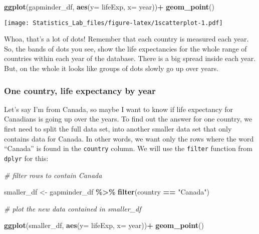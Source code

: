 \documentclass[
]{book}
\newenvironment{Shaded}{\begin{snugshade}}{\end{snugshade}}
\newcommand{\AttributeTok}[1]{\textcolor[rgb]{0.13,0.29,0.53}{#1}}
\newcommand{\CommentTok}[1]{\textcolor[rgb]{0.56,0.35,0.01}{\textit{#1}}}
\newcommand{\FunctionTok}[1]{\textcolor[rgb]{0.13,0.29,0.53}{\textbf{#1}}}
\newcommand{\NormalTok}[1]{#1}
\newcommand{\OtherTok}[1]{\textcolor[rgb]{0.56,0.35,0.01}{#1}}
\newcommand{\SpecialCharTok}[1]{\textcolor[rgb]{0.81,0.36,0.00}{\textbf{#1}}}
\newcommand{\StringTok}[1]{\textcolor[rgb]{0.31,0.60,0.02}{#1}}
\begin{document}
\begin{Shaded}
\begin{Highlighting}[]
\FunctionTok{ggplot}\NormalTok{(gapminder\_df, }\FunctionTok{aes}\NormalTok{(}\AttributeTok{y=}\NormalTok{ lifeExp, }\AttributeTok{x=}\NormalTok{ year))}\SpecialCharTok{+}
  \FunctionTok{geom\_point}\NormalTok{()}
\end{Highlighting}
\end{Shaded}

\texttt{[image: Statistics\_Lab\_files/figure-latex/1scatterplot-1.pdf]}

Whoa, that's a lot of dots! Remember that each country is measured each year. So, the bands of dots you see, show the life expectancies for the whole range of countries within each year of the database. There is a big spread inside each year. But, on the whole it looks like groups of dots slowly go up over years.

\hypertarget{one-country-life-expectancy-by-year}{%
\subsubsection{One country, life expectancy by year}\label{one-country-life-expectancy-by-year}}

Let's say I'm from Canada, so maybe I want to know if life expectancy for Canadians is going up over the years. To find out the answer for one country, we first need to split the full data set, into another smaller data set that only contains data for Canada. In other words, we want only the rows where the word ``Canada'' is found in the \texttt{country} column. We will use the \texttt{filter} function from \texttt{dplyr} for this:

\begin{Shaded}
\begin{Highlighting}[]
\CommentTok{\# filter rows to contain Canada}

\NormalTok{smaller\_df }\OtherTok{\textless{}{-}}\NormalTok{ gapminder\_df }\SpecialCharTok{\%\textgreater{}\%} 
                 \FunctionTok{filter}\NormalTok{(country }\SpecialCharTok{==} \StringTok{"Canada"}\NormalTok{)}

\CommentTok{\# plot the new data contained in smaller\_df}

\FunctionTok{ggplot}\NormalTok{(smaller\_df, }\FunctionTok{aes}\NormalTok{(}\AttributeTok{y=}\NormalTok{ lifeExp, }\AttributeTok{x=}\NormalTok{ year))}\SpecialCharTok{+}
  \FunctionTok{geom\_point}\NormalTok{()}
\end{Highlighting}
\end{Shaded}
\end{document}
